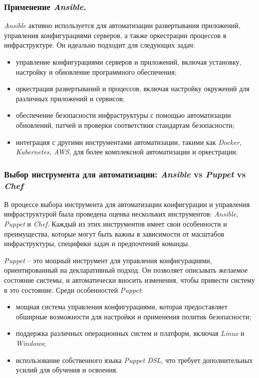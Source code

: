 \subsubsection{Применение \textit{Ansible}.}
\textit{Ansible} активно используется для автоматизации развертывания приложений, управления конфигурациями серверов, а также оркестрации процессов в инфраструктуре. Он идеально подходит для следующих задач:
\begin{itemize}
    \item управление конфигурациями серверов и приложений, включая установку, настройку и обновление программного обеспечения;
    \item оркестрация развертываний и процессов, включая настройку окружений для различных приложений и сервисов;
    \item обеспечение безопасности инфраструктуры с помощью автоматизации обновлений, патчей и проверки соответствия стандартам безопасности;
    \item интеграция с другими инструментами автоматизации, такими как \textit{Docker}, \textit{Kubernetes}, \textit{AWS}, для более комплексной автоматизации и оркестрации.
\end{itemize}

\subsubsection{Выбор инструмента для автоматизации: \textit{Ansible} vs \textit{Puppet} vs \textit{Chef}}
В процессе выбора инструмента для автоматизации конфигурации и управления инфраструктурой была проведена оценка нескольких инструментов: \textit{Ansible}, \textit{Puppet} и \textit{Chef}. Каждый из этих инструментов имеет свои особенности и преимущества, которые могут быть важны в зависимости от масштабов инфраструктуры, специфики задач и предпочтений команды.


\textit{Puppet} -- это мощный инструмент для управления конфигурациями, ориентированный на декларативный подход. Он позволяет описывать желаемое состояние системы, и автоматически вносить изменения, чтобы привести систему в это состояние. Среди особенностей \textit{Puppet}:
\begin{itemize}
    \item мощная система управления конфигурациями, которая предоставляет обширные возможности для настройки и применения политик безопасности;
    \item поддержка различных операционных систем и платформ, включая \textit{Linux} и \textit{Windows};
    \item использование собственного языка \textit{Puppet DSL}, что требует дополнительных усилий для обучения и освоения.
\end{itemize}

